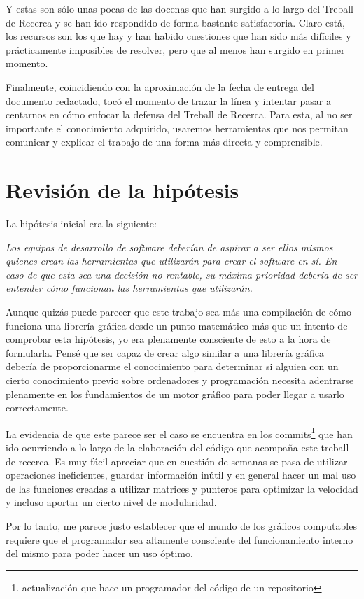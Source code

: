 Y estas son sólo unas pocas de las docenas que han surgido a lo largo del Treball de Recerca y se han ido respondido de forma bastante satisfactoria. Claro está, los recursos son los que hay y han habido cuestiones que han sido más difíciles y prácticamente imposibles de resolver, pero que al menos han surgido en primer momento.


\newpage
Finalmente, coincidiendo con la aproximación de la fecha de entrega del documento redactado, tocó el momento de trazar la línea y intentar pasar a centarnos en cómo enfocar la defensa del Treball de Recerca. Para esta, al no ser importante el conocimiento adquirido, usaremos herramientas que nos permitan comunicar y explicar el trabajo de una forma más directa y comprensible.

\section{Revisión de la hipótesis}
La hipótesis inicial era la siguiente:

\textit{Los equipos de desarrollo de software deberían de aspirar a ser ellos mismos quienes crean las herramientas que utilizarán para crear el software en sí. En caso de que esta sea una decisión no rentable, su máxima prioridad debería de ser entender cómo funcionan las herramientas que utilizarán.}

Aunque quizás puede parecer que este trabajo sea más una compilación de cómo funciona una librería gráfica desde un punto matemático más que un intento de comprobar esta hipótesis, yo era plenamente consciente de esto a la hora de formularla. Pensé que ser capaz de crear algo similar a una librería gráfica debería de proporcionarme el conocimiento para determinar si alguien con un cierto conocimiento previo sobre ordenadores y programación necesita adentrarse plenamente en los fundamientos de un motor gráfico para poder llegar a usarlo correctamente.

La evidencia de que este parece ser el caso se encuentra en los commits\footnote{actualización que hace un programador del código de un repositorio} que han ido ocurriendo a lo largo de la elaboración del código que acompaña este treball de recerca. Es muy fácil apreciar que en cuestión de semanas se pasa de utilizar operaciones ineficientes, guardar información inútil y en general hacer un mal uso de las funciones creadas a utilizar matrices y punteros para optimizar la velocidad y incluso aportar un cierto nivel de modularidad.

Por lo tanto, me parece justo establecer que el mundo de los gráficos computables requiere que el programador sea altamente consciente del funcionamiento interno del mismo para poder hacer un uso óptimo.

